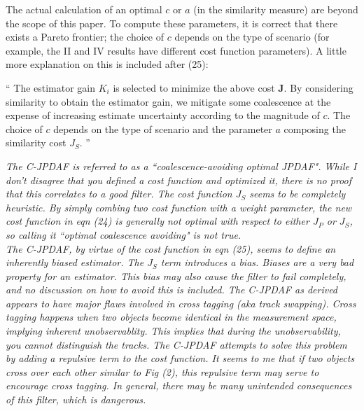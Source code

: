 \documentclass[11pt]{article}
\newenvironment{correction}{\begin{list}{}{\setlength{\leftmargin}{1cm}\setlength{\rightmargin}{1cm}}\vspace{\parsep}\item[]``}{''\end{list}}
\begin{document}
\begin{itemize}
The actual calculation of an optimal $c$ or $a$ (in the similarity measure) are beyond the scope of this paper. To compute these parameters, it is correct that there exists a Pareto frontier; the choice of $c$ depends on the type of scenario (for example, the II and IV results have different cost function parameters). A little more explanation on this is included after (25):

\begin{correction}
The estimator gain $K_i$ is selected to minimize the above cost $\mathbf{J}$. By considering similarity to obtain the estimator gain, we mitigate some coalescence at the expense of increasing estimate uncertainty according to the magnitude of $c$. The choice of $c$ depends on the type of scenario and the parameter $a$ composing the similarity cost $J_S$.
\end{correction}

\item {\itshape The C-JPDAF is referred to as a ``coalescence-avoiding optimal JPDAF".   While I don't disagree that you defined a cost function and optimized it, there is no proof that this correlates to a good filter.  The cost function $J_S$ seems to be completely heuristic.  By simply combing two cost function with a weight parameter, the new cost function in eqn (24) is generally not optimal with respect to either $J_P$ or $J_S$, so calling it ``optimal coalescence avoiding" is not true.
\\
The C-JPDAF, by virtue of the cost function in eqn (25), seems to define an inherently biased estimator.  The $J_S$ term introduces a bias.  Biases are a very bad property for an estimator.  This bias may also cause the filter to fail completely, and no discussion on how to avoid this is included. The C-JPDAF as derived appears to have major flaws involved in cross tagging (aka track swapping).  Cross tagging happens when two objects become identical in the measurement space, implying inherent unobservablity.  This implies that during the unobservability, you cannot distinguish the tracks. The C-JPDAF attempts to solve this problem by adding a repulsive term to the cost function.  It seems to me that if two objects cross over each other similar to Fig (2), this repulsive term may serve to encourage cross tagging.  In general, there may be many unintended consequences of this filter, which is dangerous.}


\end{itemize}
\end{document}
